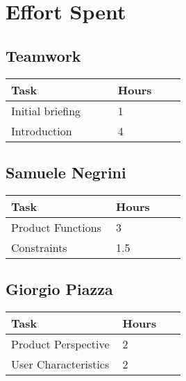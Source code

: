 \chapter{Effort Spent}

\section{Teamwork}
\vspace{2mm}
\begin{center}
    \begin{tabular}{@{}p{0.3\linewidth} p{0.2\linewidth}@{}}
        \hline
        \textbf{Task} & \textbf{Hours} \\ \hline
        Initial briefing & 1 \\ \hline
        Introduction & 4 \\ \hline
    \end{tabular}
\end{center}

\section{Samuele Negrini}
\vspace{2mm}
\begin{center}
	\begin{tabular}{@{}p{0.3\linewidth} p{0.2\linewidth}@{}}
		\hline
		\textbf{Task} & \textbf{Hours} \\ \hline
		Product Functions & 3 \\ \hline
		Constraints & 1.5 \\ \hline
	\end{tabular}
\end{center}

\section{Giorgio Piazza}
\vspace{2mm}
\begin{center}
	\begin{tabular}{@{}p{0.3\linewidth} p{0.2\linewidth}@{}}
		\hline
		\textbf{Task} & \textbf{Hours} \\ \hline
		Product Perspective & 2 \\ \hline
		User Characteristics & 2 \\ \hline
	\end{tabular}
\end{center}